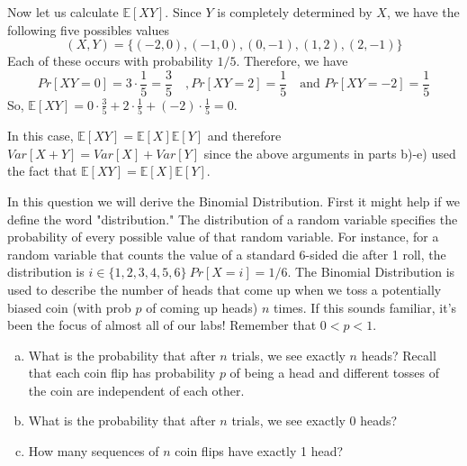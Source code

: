 \documentclass[]{article}
\newif\ifsolutions
\renewcommand{\answer}[1]{{\color{mydarkblue}\textbf{Solution:}#1}}
\def \exx {\mathbb{E}}
\begin{document}
\begin{qunlist}
\begin{enumerate}[a)]
{{Now let us calculate $\exx[XY]$. Since $Y$ is completely determined by $X$, we have the following five possibles values 
\[ (X,Y) = \{ (-2,0), (-1,0), (0,-1), (1, 2), (2,-1) \} \]
Each of these occurs with probability $1/5$. Therefore, we have 
\[ Pr[XY = 0] = 3\cdot \frac{1}{5} = \frac{3}{5} \quad, 
Pr[XY = 2] = \frac{1}{5} \quad\text{and } 
Pr[XY = -2] = \frac{1}{5} \]
So, $\exx[XY] = 0\cdot \frac{3}{5} + 2\cdot \frac{1}{5} + (-2)\cdot \frac{1}{5} = 0$. 

In this case, $\exx[XY] = \exx[X]\exx[Y]$ and therefore $Var[X+Y] = Var[X] + Var[Y]$ since the above arguments in parts b)-e) used the fact that $\exx[XY] = \exx[X]\exx[Y]$.
}}
\fi
\end{enumerate}


\newpage
  
In this question we will derive the Binomial Distribution. First it might help if we define the word "distribution." The distribution of a random variable specifies the probability of every possible value of that random variable. For instance, for a random variable that counts the value of a standard 6-sided die after 1 roll, the distribution is $i \in \{1,2,3,4,5,6\} \ Pr[X = i] = 1/6$. %
The Binomial Distribution is used to describe the number of heads that
come up when we toss a potentially biased coin (with prob $p$ of
coming up heads) $n$ times. If this sounds familiar, it's been the focus of almost all of our labs! Remember that $0 < p < 1$.
\begin{enumerate}[a)]
\qpart
\item What is the probability that after $n$ trials, we see exactly
  $n$ heads? Recall that each coin flip has probability $p$ of being a
  head and different tosses of the coin are independent of each other.
  
  \ifsolutions{ \answer {
  Each trial is independent, and the probability of a head for each trial is $p$ so we have probability $p^n$
  }} 
  \fi
\qpart
\item What is the probability that after $n$ trials, we see exactly $0$ heads?

 \ifsolutions{ \answer {
   Each trial is independent, and the probability of a head for each trial is $1-p$ so we have probability $(1-p)^n$
  }} 
  \fi
\qpart
\item How many sequences of $n$ coin flips have exactly 1 head?


\end{enumerate}
\end{qunlist}
\end{document}
